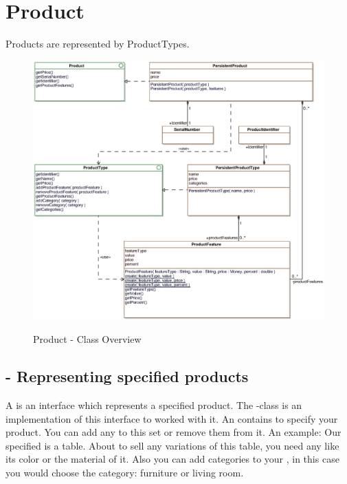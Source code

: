 \newpage
\section{Product}

Products are represented by ProductTypes.

\begin{figure}[ht]
	\centering
  \includegraphics[width=1.0\textwidth]{images/Product_Overview.eps}
	\label{product_overview}
	\caption{Product - Class Overview}
\end{figure}

\subsection{ - Representing specified products}
A  is an interface which represents a specified product. The -class is an implementation of this interface to worked with it.
An  contains  to specify your product. You can add any   to this set or remove them from it.
An example: Our specified  is a table. About to sell any variations of this table, you need any  like its color or the material of it. 
Also you can add categories to your , in this case you would choose the category: furniture or living room.

